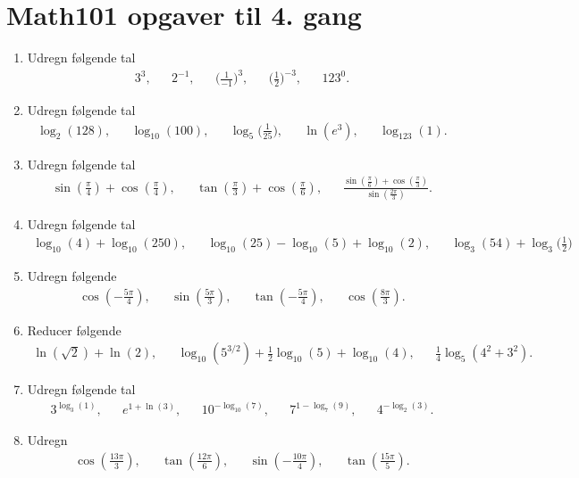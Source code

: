 \newpage
\section{Math101 opgaver til 4. gang}
\begin{enumerate}
	\item Udregn følgende tal
	\begin{align*}
	3^3,&& 2^{-1}, &&\Big(\frac{1}{-1}\Big)^{3},&&\Big(\frac{1}{2}\Big)^{-3},&& 123^0.
	\end{align*}
	\item Udregn følgende tal
	\begin{align*}
	\log_2(128),&& \log_{10}(100),&& \log_5\Big(\frac{1}{25}\Big),&& \ln(e^3),&&\log_{123}(1).
	\end{align*}
	
	\item Udregn følgende tal
	\begin{align*}
	\sin(\frac{\pi}{4})+\cos(\frac{\pi}{4}),&& \tan(\frac{\pi}{3})+\cos(\frac{\pi}{6}),&& \frac{\sin(\frac{\pi}{6})+\cos(\frac{\pi}{3})}{\sin(\frac{2\pi}{3})}.
	\end{align*}
	

	\item Udregn følgende tal
	\begin{align*}
	\log_{10}(4)+\log_{10}(250),&&\log_{10}(25)-\log_{10}(5)+\log_{10}(2),&& \log_3(54)+\log_3\Big(\frac{1}{2}\Big)
	\end{align*}
	
	\item Udregn følgende
	\begin{align*}
	\cos(-\frac{5\pi}{4}),&& \sin(\frac{5\pi}{3}),&&\tan(-\frac{5\pi}{4}),&& \cos(\frac{8\pi}{3}).
	\end{align*}
	
	
	\item Reducer følgende
	\begin{align*}
	\ln(\sqrt{2})+\ln(2),&& \log_{10}(5^{3/2})+\frac{1}{2}\log_{10}(5)+\log_{10}(4),&& \frac{1}{4}\log_5(4^2+3^2).
	\end{align*}
	
	
	\item Udregn følgende tal
	\begin{align*}
	3^{\log_3(1)},&&e^{1+\ln(3)},&& 10^{-\log_{10}(7)},&& 7^{1-\log_7(9)},&& 4^{-\log_2(3)}.
	\end{align*}
	
	\item Udregn
	\begin{align*}
	\cos(\frac{13\pi}{3}),&& \tan(\frac{12\pi}{6}),&& \sin(-\frac{10\pi}{4}),&& \tan(\frac{15 \pi}{5}).
	\end{align*}
	

\end{enumerate}

